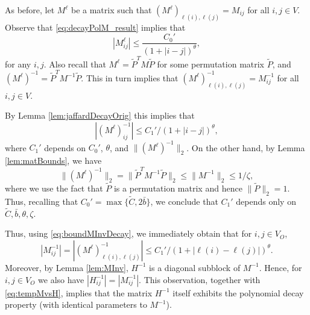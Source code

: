 \documentclass[opre,nonblindrev]{informs3} %
\begin{document}
\begin{APPENDIX}{}
As before,
let $M^\ell$ be a matrix such that $(M^{\ell})_{\ell(i),\ell(j)}=M_{ij}$ for all $i,j\in V$.
Observe that
\eqref{eq:decayPolM_result} implies that
\begin{equation}\label{eq:decayPolM_result2}
|M^\ell_{ij}|\leq  \frac{ C_0'}{(1+ |i-j|)^\theta},
\end{equation}
for any $i,j$.
Also recall that
$M^\ell= \tilde{P}^T M \tilde{P}$ for some permutation matrix $\tilde{P}$, and
$(M^\ell)^{-1}=  \tilde{P}^T M^{-1} \tilde{P}$.
This in turn implies that   $(M^\ell)^{-1}_{\ell(i),\ell(j)}=M^{-1}_{ij}$ for all $i,j \in V$.

By Lemma \ref{lem:jaffardDecayOrig} this implies that
\begin{equation}\label{eq:boundMInvDecay}
|(M^\ell)^{-1}_{ij}|\leq  C_1'/(1+ |i-j|)^\theta,
\end{equation}
where
$C_1'$ depends on $C_0'$, $\theta$, and $\|(M^{\ell})^{-1}\|_2$.
On the other hand, by Lemma \ref{lem:matBounds},
we have
\[
\|(M^{\ell})^{-1}\|_2 =
\|\tilde{P}^T M^{-1} \tilde{P}\|_2
\leq \|M^{-1}\|_2  \leq 1/\zeta,
\]
where we use the fact that $\tilde{P}$ is a permutation matrix and hence $\|\tilde{P}\|_2=1$.
Thus, recalling that $C_0'=\max\{\tilde{C}, 2\bar b\}$, we conclude that
$C_1'$ depends only on $\tilde{C},\bar{b}, \theta, \zeta$.


Thus, using \eqref{eq:boundMInvDecay}, we immediately obtain
that for $i,j\in V_O$,
\begin{equation}\label{eq:tempMvsH}
|M^{-1}_{ij} |= |(M^\ell)^{-1}_{\ell(i),\ell(j)} |\leq C_1'/(1+ |\ell(i)-\ell(j)|)^\theta.
\end{equation}
Moreover,
by Lemma \ref{lem:MInv}, $H^{-1}$ is a diagonal subblock of $M^{-1}$.
Hence,  for $i,j\in V_O$ we also have $|H^{-1}_{ij}| =|M^{-1}_{ij} |$.
This observation, together with \eqref{eq:tempMvsH}, implies that
the matrix $H^{-1}$ itself exhibits the polynomial decay property (with identical parameters to $M^{-1}$).
\hfill \halmos




\end{APPENDIX}
\end{document}
